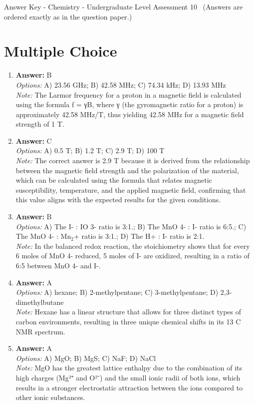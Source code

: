 \documentclass[12pt]{article}
\begin{document}
\begin{center}
Answer Key - Chemistry - Undergraduate Level Assessment 10 \
\small (Answers are ordered exactly as in the question paper.)
\end{center}

\section*{Multiple Choice}
\begin{enumerate}[label=\arabic*.]
\item \textbf{Answer:} B
\\ \textit{Options:} A) 23.56 GHz; B) 42.58 MHz; C) 74.34 kHz; D) 13.93 MHz
\\ \textit{Note:} The Larmor frequency for a proton in a magnetic field is calculated using the formula f = γB, where γ (the gyromagnetic ratio for a proton) is approximately 42.58 MHz/T, thus yielding 42.58 MHz for a magnetic field strength of 1 T.
\item \textbf{Answer:} C
\\ \textit{Options:} A) 0.5 T; B) 1.2 T; C) 2.9 T; D) 100 T
\\ \textit{Note:} The correct answer is 2.9 T because it is derived from the relationship between the magnetic field strength and the polarization of the material, which can be calculated using the formula that relates magnetic susceptibility, temperature, and the applied magnetic field, confirming that this value aligns with the expected results for the given conditions.
\item \textbf{Answer:} B
\\ \textit{Options:} A) The I- : IO 3- ratio is 3:1.; B) The MnO 4- : I- ratio is 6:5.; C) The MnO 4- : Mn$_{2}$+ ratio is 3:1.; D) The H+ : I- ratio is 2:1.
\\ \textit{Note:} In the balanced redox reaction, the stoichiometry shows that for every 6 moles of MnO 4- reduced, 5 moles of I- are oxidized, resulting in a ratio of 6:5 between MnO 4- and I-.
\item \textbf{Answer:} A
\\ \textit{Options:} A) hexane; B) 2-methylpentane; C) 3-methylpentane; D) 2,3-dimethylbutane
\\ \textit{Note:} Hexane has a linear structure that allows for three distinct types of carbon environments, resulting in three unique chemical shifts in its 13 C NMR spectrum.
\item \textbf{Answer:} A
\\ \textit{Options:} A) MgO; B) MgS; C) NaF; D) NaCl
\\ \textit{Note:} MgO has the greatest lattice enthalpy due to the combination of its high charges (Mg²⁺ and O²⁻) and the small ionic radii of both ions, which results in a stronger electrostatic attraction between the ions compared to other ionic substances.
\end{enumerate}
\end{document}
